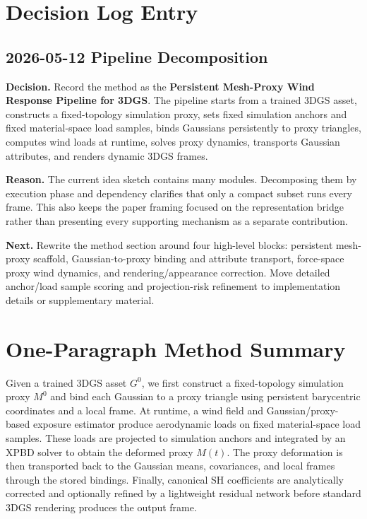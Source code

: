 \documentclass[11pt,a4paper]{article}
\begin{document}
\section{Decision Log Entry}

\subsection*{2026-05-12 Pipeline Decomposition}

\textbf{Decision.} Record the method as the \textbf{Persistent Mesh-Proxy Wind Response Pipeline for 3DGS}. The pipeline starts from a trained 3DGS asset, constructs a fixed-topology simulation proxy, sets fixed simulation anchors and fixed material-space load samples, binds Gaussians persistently to proxy triangles, computes wind loads at runtime, solves proxy dynamics, transports Gaussian attributes, and renders dynamic 3DGS frames.

\textbf{Reason.} The current idea sketch contains many modules. Decomposing them by execution phase and dependency clarifies that only a compact subset runs every frame. This also keeps the paper framing focused on the representation bridge rather than presenting every supporting mechanism as a separate contribution.

\textbf{Next.} Rewrite the method section around four high-level blocks: persistent mesh-proxy scaffold, Gaussian-to-proxy binding and attribute transport, force-space proxy wind dynamics, and rendering/appearance correction. Move detailed anchor/load sample scoring and projection-risk refinement to implementation details or supplementary material.

\section{One-Paragraph Method Summary}

Given a trained 3DGS asset $G^0$, we first construct a fixed-topology simulation proxy $M^0$ and bind each Gaussian to a proxy triangle using persistent barycentric coordinates and a local frame. At runtime, a wind field and Gaussian/proxy-based exposure estimator produce aerodynamic loads on fixed material-space load samples. These loads are projected to simulation anchors and integrated by an XPBD solver to obtain the deformed proxy $M(t)$. The proxy deformation is then transported back to the Gaussian means, covariances, and local frames through the stored bindings. Finally, canonical SH coefficients are analytically corrected and optionally refined by a lightweight residual network before standard 3DGS rendering produces the output frame.



\end{document}
